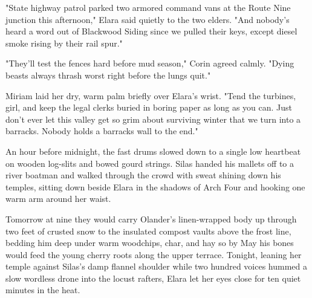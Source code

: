 "State highway patrol parked two armored command vans at the Route Nine junction this afternoon," Elara said quietly to the two elders. "And nobody's heard a word out of Blackwood Siding since we pulled their keys, except diesel smoke rising by their rail spur."

"They'll test the fences hard before mud season," Corin agreed calmly. "Dying beasts always thrash worst right before the lungs quit."

Miriam laid her dry, warm palm briefly over Elara's wrist. "Tend the turbines, girl, and keep the legal clerks buried in boring paper as long as you can. Just don't ever let this valley get so grim about surviving winter that we turn into a barracks. Nobody holds a barracks wall to the end."

An hour before midnight, the fast drums slowed down to a single low heartbeat on wooden log-slits and bowed gourd strings. Silas handed his mallets off to a river boatman and walked through the crowd with sweat shining down his temples, sitting down beside Elara in the shadows of Arch Four and hooking one warm arm around her waist.

Tomorrow at nine they would carry Olander's linen-wrapped body up through two feet of crusted snow to the insulated compost vaults above the frost line, bedding him deep under warm woodchips, char, and hay so by May his bones would feed the young cherry roots along the upper terrace. Tonight, leaning her temple against Silas's damp flannel shoulder while two hundred voices hummed a slow wordless drone into the locust rafters, Elara let her eyes close for ten quiet minutes in the heat.
